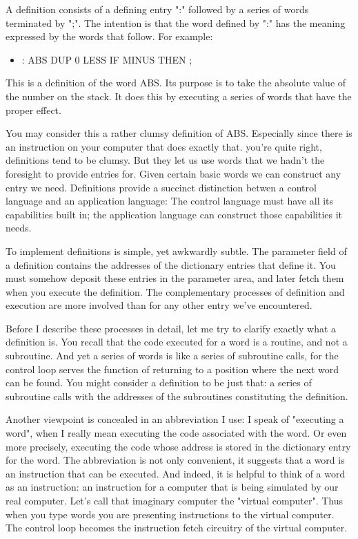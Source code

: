 \documentclass[b5paper, oneside]{book}
\begin{document}
A definition consists of a defining entry ":" followed by a series of words terminated by ";". The intention is that the word defined by ":" has the meaning expressed by the words that follow. For example:\begin{itemize}
   \item : ABS DUP 0 LESS IF MINUS THEN ;\end{itemize}
This is a definition of the word ABS. Its purpose is to take the absolute value of the number on the stack. It does this by executing a series of words that have the proper effect.

You may consider this a rather clumsy definition of ABS. Especially since there is an instruction on your computer that does exactly that. you're quite right, definitions tend to be clumsy. But they let us use words that we hadn't the foresight to provide entries for. Given certain basic words we can construct any entry we need. Definitions provide a succinct distinction betwen a control language and an application language: The control language must have all its capabilities built in; the application language can construct those capabilities it needs.

To implement definitions is simple, yet awkwardly subtle. The parameter field of a definition contains the addresses of the dictionary entries that define it. You must somehow deposit these entries in the parameter area, and later fetch them when you execute the definition. The complementary processes of definition and execution are more involved than for any other entry we've encountered.

Before I describe these processes in detail, let me try to clarify exactly what a definition is. You recall that the code executed for a word is a routine, and not a subroutine. And yet a series of words is like a series of subroutine calls, for the control loop serves the function of returning to a position where the next word can be found. You might consider a definition to be just that: a series of subroutine calls with the addresses of the subroutines constituting the definition.

Another viewpoint is concealed in an abbreviation I use: I speak of "executing a word", when I really mean executing the code associated with the word. Or even more precisely, executing the code whose address is stored in the dictionary entry for the word. The abbreviation is not only convenient, it suggests that a word is an instruction that can be executed. And indeed, it is helpful to think of a word as an instruction: an instruction for a computer that is being simulated by our real computer. Let's call that imaginary computer the "virtual computer". Thus when you type words you are presenting instructions to the virtual computer. The control loop becomes the instruction fetch circuitry of the virtual computer.
\end{document}
